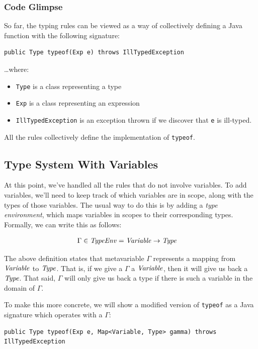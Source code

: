 \subsubsection{Code Glimpse}
So far, the typing rules can be viewed as a way of collectively defining a Java function with the following signature:

\begin{verbatim}
public Type typeof(Exp e) throws IllTypedException
\end{verbatim}

\noindent
\ldots where:
\begin{itemize}
\item \texttt{Type} is a class representing a type
\item \texttt{Exp} is a class representing an expression
\item \texttt{IllTypedException} is an exception thrown if we discover that \texttt{e} is ill-typed.
\end{itemize}

\noindent
All the rules collectively define the implementation of \texttt{typeof}.

\subsection{Type System With Variables}
At this point, we've handled all the rules that do not involve variables.
To add variables, we'll need to keep track of which variables are in scope, along with the types of those variables.
The usual way to do this is by adding a \emph{type environment}, which maps variables in scopes to their corresponding types.
Formally, we can write this as follows:

\begin{align*}
  \Gamma \in \mathit{TypeEnv} &= \mathit{Variable} \to \mathit{Type}
\end{align*}

The above definition states that metavariable $\Gamma$ represents a mapping from $\mathit{Variable}$ to $\mathit{Type}$.
That is, if we give a $\Gamma$ a $\mathit{Variable}$, then it will give us back a $\mathit{Type}$.
That said, $\Gamma$ will only give us back a type if there is such a variable in the domain of $\Gamma$.

To make this more concrete, we will show a modified version of \texttt{typeof} as a Java signature which operates with a $\Gamma$:

\begin{verbatim}
public Type typeof(Exp e, Map<Variable, Type> gamma) throws IllTypedException
\end{verbatim}

